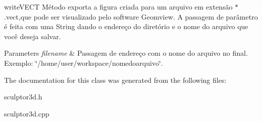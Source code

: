 write\+V\+E\+CT Método exporta a figura criada para um arquivo em extensão $\ast$.vect,que pode ser visualizado pelo software Geomview. A passagem de parâmetro é feita com uma String dando o endereço do diretório e o nome do arquivo que você deseja salvar. 


\begin{DoxyParams}{Parameters}
{\em filename} & Passagem de endereço com o nome do arquivo no final. Exemplo\+: \char`\"{}/home/user/workspace/nomedoarquivo\char`\"{}. \\
\hline
\end{DoxyParams}


The documentation for this class was generated from the following files\+:\begin{DoxyCompactItemize}
\item 
sculptor3d.\+h\item 
sculptor3d.\+cpp\end{DoxyCompactItemize}
